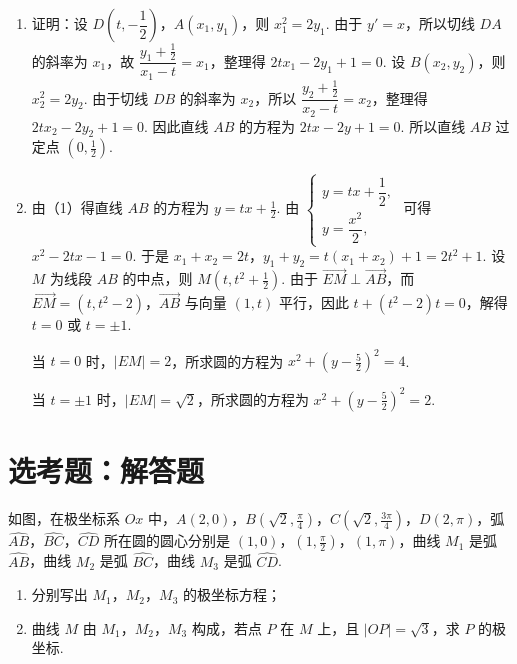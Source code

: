 \begin{solution}
\begin{enumerate}
\item 证明：设 \(D(t,-\dfrac12)\)，\(A(x_1,y_1)\)，则 \(x_1^2=2y_1\). 由于 \(y'=x\)，所以切线 \(DA\) 的斜率为 \(x_1\)，故 \(\dfrac{y_1+\frac12}{x_1-t}=x_1\)，整理得 \(2tx_1-2y_1+1=0\). 设 \(B(x_2,y_2)\)，则 \(x_2^2=2y_2\). 由于切线 \(DB\) 的斜率为 \(x_2\)，所以 \(\dfrac{y_2+\frac12}{x_2-t}=x_2\)，整理得 \(2tx_2-2y_2+1=0\). 因此直线 \(AB\) 的方程为 \(2tx-2y+1=0\). 所以直线 \(AB\) 过定点 \(\left(0,\frac12\right)\).

\item 由（1）得直线 \(AB\) 的方程为 \(y=tx+\frac12\). 由 \(\begin{cases}
y=tx+\dfrac12,\\
y=\dfrac{x^2}{2},
\end{cases}\) 可得 \(x^2-2tx-1=0\). 于是 \(x_1+x_2=2t\)，\(y_1+y_2=t(x_1+x_2)+1=2t^2+1\). 设 \(M\) 为线段 \(AB\) 的中点，则 \(M\left(t,t^2+\frac12\right)\). 由于 \(\overrightarrow{EM}\perp\overrightarrow{AB}\)，而 \(\overrightarrow{EM}=\left(t,t^2-2\right)\)，\(\overrightarrow{AB}\) 与向量 \((1,t)\) 平行，因此 \(t+\left(t^2-2\right)t=0\)，解得 \(t=0\) 或 \(t=\pm1\).

当 \(t=0\) 时，\(|EM|=2\)，所求圆的方程为 \(x^2+\left(y-\frac52\right)^2=4\).

当 \(t=\pm1\) 时，\(|EM|=\sqrt2\)，所求圆的方程为 \(x^2+\left(y-\frac52\right)^2=2\).
\end{enumerate}
\end{solution}


\section{选考题：解答题}

\begin{problem}
如图，在极坐标系 \(Ox\) 中，\(A(2,0)\)，\(B\left(\sqrt2,\frac{\pi}{4}\right)\)，\(C\left(\sqrt2,\frac{3\pi}{4}\right)\)，\(D(2,\pi)\)，弧 \(\widehat{AB}\)，\(\widehat{BC}\)，\(\widehat{CD}\) 所在圆的圆心分别是 \((1,0)\)，\(\left(1,\frac{\pi}{2}\right)\)，\((1,\pi)\)，曲线 \(M_1\) 是弧 \(\widehat{AB}\)，曲线 \(M_2\) 是弧 \(\widehat{BC}\)，曲线 \(M_3\) 是弧 \(\widehat{CD}\).

\begin{enumerate}
\item 分别写出 \(M_1\)，\(M_2\)，\(M_3\) 的极坐标方程；
\item 曲线 \(M\) 由 \(M_1\)，\(M_2\)，\(M_3\) 构成，若点 \(P\) 在 \(M\) 上，且 \(|OP|=\sqrt3\)，求 \(P\) 的极坐标.
\end{enumerate}

\end{problem}

